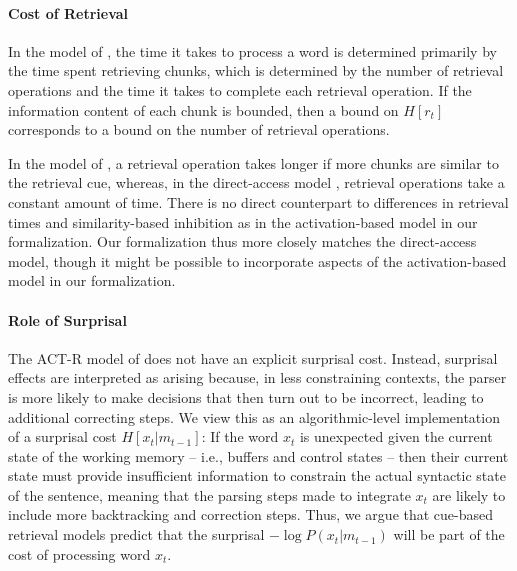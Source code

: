 \documentclass[11pt,letterpaper]{article}
\begin{document}
\paragraph{Cost of Retrieval}
In the model of \cite{lewis-activation-based-2005}, the time it takes to process a word is determined primarily by the time spent retrieving chunks, which is determined by the number of retrieval operations and the time it takes to complete each retrieval operation.
If the information content of each chunk is bounded, then a bound on $H[r_t]$ corresponds to a bound on the number of retrieval operations.

In the model of \cite{lewis-activation-based-2005}, a retrieval operation takes longer if more chunks are similar to the retrieval cue, whereas, in the direct-access model \citep{mcelree2000sentence,nicenboim2018models,vasishth2019computational}, retrieval operations take a constant amount of time.
There is no direct counterpart to differences in retrieval times and similarity-based inhibition as in the activation-based model in our formalization.
Our formalization thus more closely matches the direct-access model, though it might be possible to incorporate aspects of the activation-based model in our formalization.

\paragraph{Role of Surprisal}
The ACT-R model of \cite{lewis-activation-based-2005} does not have an explicit surprisal cost.
Instead, surprisal effects are interpreted as arising because, in less constraining contexts, the parser is more likely to make decisions that then turn out to be incorrect, leading to additional correcting steps.
We view this as an algorithmic-level implementation of a surprisal cost $H[x_t|m_{t-1}]$:
If the word $x_t$ is unexpected given the current state of the working memory -- i.e., buffers and control states -- then their current state must provide insufficient information to constrain the actual syntactic state of the sentence, meaning that the parsing steps made to integrate $x_t$ are likely to include more backtracking and correction steps.
Thus, we argue that cue-based retrieval models predict that the surprisal $- \log P(x_t|m_{t-1})$ will be part of the cost of processing word $x_t$.
\end{document}
